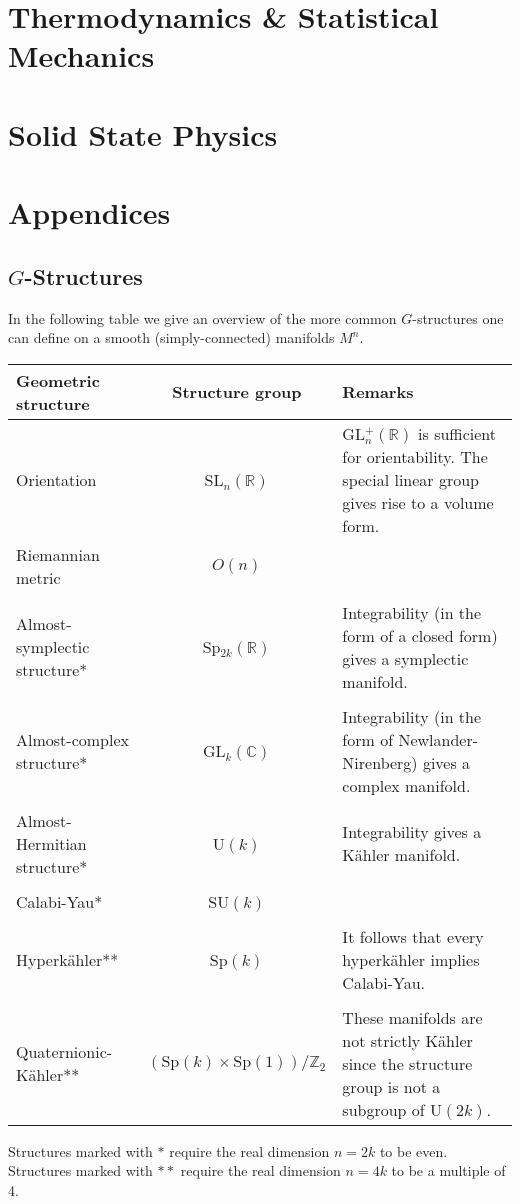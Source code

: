 \documentclass[11pt, a4paper]{report}
\begin{document}
\part{Thermodynamics \& Statistical Mechanics}



\part{Solid State Physics}


\part{Appendices}
\begin{appendices}

\chapter{\texorpdfstring{$G$-Structures}{G-Structures}}
	In the following table we give an overview of the more common $G$-structures one can define on a smooth (simply-connected) manifolds $M^n$.
	\begin{center}
		\begin{tabularx}{\textwidth}{|l|c|X|}
			 \hline
			 	Geometric structure&Structure group&Remarks\\
			 \hline
			 	Orientation&SL$_n(\mathbb{R})$&GL$^+_n(\mathbb{R})$ is sufficient for orientability. The special linear group gives rise to a volume form.\\
			 	Riemannian metric&$O(n)$&\\&&\\
			 	Almost-symplectic structure*&Sp$_{2k}(\mathbb{R})$&Integrability (in the form of a closed form) gives a symplectic manifold.\\&&\\
			 	Almost-complex structure*&GL$_k(\mathbb{C})$&Integrability (in the form of Newlander-Nirenberg) gives a complex manifold.\\&&\\
			 	Almost-Hermitian structure*&U$(k)$&Integrability gives a K\"ahler manifold.\\&&\\
			 	Calabi-Yau*&SU$(k)$&\\&&\\
			 	Hyperk\"ahler**&Sp$(k)$&It follows that every hyperk\"ahler implies Calabi-Yau.\\&&\\
			 	Quaternionic-K\"ahler**\footnotemark&$(\text{Sp}(k)\times\text{Sp}(1))/\mathbb{Z}_2$&These manifolds are not strictly K\"ahler since the structure group is not a subgroup of U$(2k)$.\\
			 \hline
		\end{tabularx}
	\end{center}
	Structures marked with $\ast$ require the real dimension $n=2k$ to be even. Structures marked with $\ast\ast$ require the real dimension $n=4k$ to be a multiple of 4.
	

\end{appendices}
\end{document}
